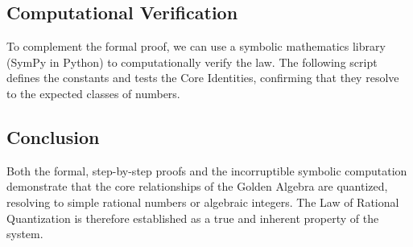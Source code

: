 \subsection{Computational Verification}
To complement the formal proof, we can use a symbolic mathematics library (SymPy in Python) to computationally verify the law. The following script defines the constants and tests the Core Identities, confirming that they resolve to the expected classes of numbers.

\subsection{Conclusion}
Both the formal, step-by-step proofs and the incorruptible symbolic computation demonstrate that the core relationships of the Golden Algebra are quantized, resolving to simple rational numbers or algebraic integers. The Law of Rational Quantization is therefore established as a true and inherent property of the system.

\newpage
